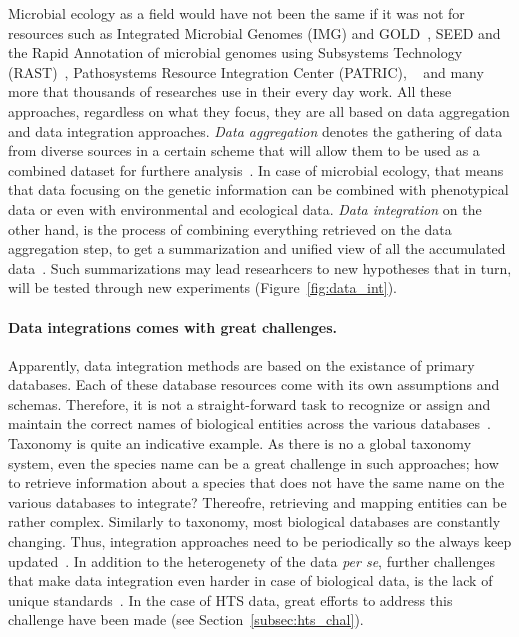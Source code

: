       Microbial ecology as a field would have not been the same if it was not 
      for resources such as 
      Integrated Microbial Genomes (IMG) and GOLD~\cite{chen2021img}, 
      SEED and the Rapid Annotation of microbial genomes using Subsystems Technology (RAST)~\cite{overbeek2014seed}, 
      Pathosystems Resource Integration Center (PATRIC),
      ~\cite{zhulin2015databases}
      and many more that thousands of researches use in their every day work. 
      All these approaches, regardless on what they focus, they are all based on data aggregation and data integration approaches. 
      \textit{Data aggregation} denotes the gathering of data from diverse sources
      in a certain scheme that will allow them to be used as a combined dataset for 
      furthere analysis~\cite{simpson2010secure}. 
      In case of microbial ecology, that means that data focusing on the genetic 
      information can be combined with phenotypical data or even with environmental and 
      ecological data.
      \textit{Data integration} on the other hand, is the process of combining everything
      retrieved on the data aggregation step, 
      to get a summarization and unified view of all the accumulated data~\cite{schneider2012teaching}.
      Such summarizations may lead researhcers to new hypotheses that 
      in turn, will be tested through new experiments (Figure~\ref{fig:data_int}).


      \paragraph{Data integrations comes with great challenges.}

      Apparently, data integration methods are based on the existance of primary databases. 
      Each of these database resources come with its own assumptions and schemas. 
      Therefore, it is not a straight-forward task to recognize or assign and maintain 
      the correct names of biological entities across the various databases~\cite{stein2003integrating}.
      Taxonomy is quite an indicative example. 
      As there is no a global taxonomy system, even the species name can be a 
      great challenge in such approaches; how to retrieve information about a species
      that does not have the same name on the various databases to integrate? 
      Thereofre, retrieving and mapping entities can be rather complex.  
      Similarly to taxonomy, most biological databases are constantly changing. 
      Thus, integration approaches need to be periodically so the always keep updated~\cite{stein2003integrating}.
      In addition to the heterogenety of the data \textit{per se},
      further challenges that make data integration even harder in case of biological data,
      is the lack of unique standards~\cite{triplet2011systems}.
      In the case of HTS data, great efforts to address this challenge have been 
      made (see Section~\ref{subsec:hts_chal}).


